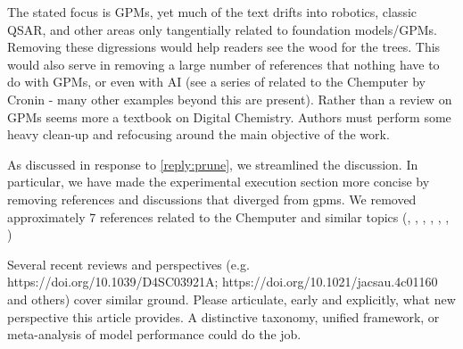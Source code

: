 \begin{point}
The stated focus is GPMs, yet much of the text drifts into robotics, classic QSAR, and other areas only tangentially related to foundation models/GPMs. Removing these digressions would help readers see the wood for the trees. This would also serve in removing a large number of references that nothing have to do with GPMs, or even with AI (see a series of related to the Chemputer by Cronin - many other examples beyond this are present). Rather than a review on GPMs seems more a textbook on Digital Chemistry. Authors must perform some heavy clean-up and refocusing around the main objective of the work.
\end{point}

\begin{reply}

As discussed in response to \cref{reply:prune}, we streamlined the discussion.
In particular, we have made the experimental execution section more concise by removing references and discussions that diverged from \glspl{gpm}. We removed approximately 7 references related to the Chemputer and similar topics (\autocite{steiner2019organic}, \autocite{hammer2021chemputation}, \autocite{rauschen2024universal}, \autocite{strieth-kalthoff2024delocalized}, \autocite{wilbraham2021chemPU}, \autocite{mehr2023digitizing}, \autocite{leonov2024integrated})


\end{reply}

\begin{point}
Several recent reviews and perspectives (e.g. https://doi.org/10.1039/D4SC03921A; https://doi.org/10.1021/jacsau.4c01160 and others) cover similar ground. Please articulate, early and explicitly, what new perspective this article provides. A distinctive taxonomy, unified framework, or meta-analysis of model performance could do the job.
\end{point}

